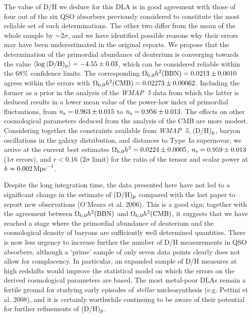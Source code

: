 \documentclass[useAMS,usenatbib]{mn2e}
\begin{document}
The value of D/H we deduce for this DLA is in good
agreement with those of four out of the six QSO absorbers
previously considered to constitute the most reliable set
of such determinations.
The other two differ from the mean of the whole sample
by $\sim 2 \sigma$, and we have identified possible
reasons why their errors may have been underestimated
in the original reports. We propose that the determination
of the primordial abundance of deuterium is converging
towards the value
$\langle \log {\rm (D/H)_p} \rangle = -4.55 \pm 0.03$,
which can be considered reliable within the
68\% confidence limits.
The corresponding
$\Omega_{\rm b,0}h^2{\rm  (BBN) } = 0.0213 \pm 0.0010$
agrees within the errors with
$\Omega_{\rm b,0}h^2{\rm  (CMB) } = 0.02273 \pm 0.00062$.
Including the former as a prior in the analysis
of the \textit{WMAP~5} data from which the latter is deduced
results in a lower mean
value of the power-law index
of primordial fluctuations, from $n_{\rm s} = 0.963 \pm 0.015$ to
$n_{\rm s} = 0.956 \pm 0.013$.
The effects on other cosmological parameters deduced from
the analysis of the CMB are more modest.
Considering together the constraints available from
\textit{WMAP~5}, (D/H)$_{\rm p}$, baryon oscillations
in the galaxy distribution, and distances to Type~Ia supernovae,
we arrive at the current best estimates
$\Omega_{\rm b,0}h^2 = 0.0224 \pm  0.0005$,
$n_{\rm s} = 0.959 \pm 0.013$ ($1 \sigma$ errors),
and $r < 0.16$ ($2 \sigma$ limit) for the ratio of
the tensor and scalar power at
$k=0.002\,{\rm Mpc}^{-1}$.

Despite the long integration time, the data presented here
have not led to a significant change in
the estimate of (D/H)$_{\rm p}$ compared with the last
paper to report new observations (O'Meara et al. 2006).
This is a good sign; together with the agreement between
$\Omega_{\rm b,0}h^2{\rm  (BBN) }$ and
$\Omega_{\rm b,0}h^2{\rm  (CMB) }$, it suggests that
we have reached a stage where the primordial abundance of 
deuterium and the cosmological density of baryons are 
sufficiently well determined quantities.
There is now less urgency to increase further the number
of D/H measurements in QSO absorbers, although
a `prime' sample of only seven data points clearly
does not allow for complacency. In particular,
an expanded sample of D/H measures at high redshifts
would improve the statistical model on which
the errors on the derived cosmological parameters 
are based.
The most metal-poor DLAs remain a fertile ground
for studying early episodes of \emph{stellar} nucleosynthesis 
(e.g. Pettini et al. 2008),
and it is certainly worthwhile continuing to be aware
of their potential for further refinements of
(D/H)${\rm _p}$.
\end{document}
